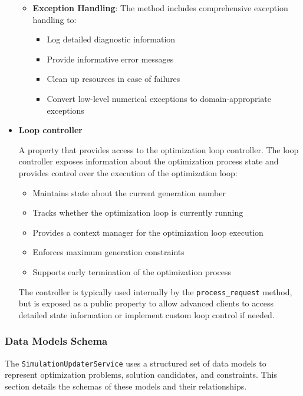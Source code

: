 \begin{itemize}
\begin{itemize}
		\item \textbf{Exception Handling}: The method includes comprehensive exception handling to:
		\begin{itemize}
			\item Log detailed diagnostic information
			\item Provide informative error messages
			\item Clean up resources in case of failures
			\item Convert low-level numerical exceptions to domain-appropriate exceptions
		\end{itemize}
	\end{itemize}

	\item \textbf{Loop controller}

	A property that provides access to the optimization loop controller. The loop controller exposes information about the optimization process state and provides control over the execution of the optimization loop:

	\begin{itemize}
		\item Maintains state about the current generation number
		\item Tracks whether the optimization loop is currently running
		\item Provides a context manager for the optimization loop execution
		\item Enforces maximum generation constraints
		\item Supports early termination of the optimization process
	\end{itemize}

	The controller is typically used internally by the \texttt{process\_request} method, but is exposed as a public property to allow advanced clients to access detailed state information or implement custom loop control if needed.

\end{itemize}



\subsubsection{Data Models Schema}

The \texttt{SimulationUpdaterService} uses a structured set of data models to represent optimization problems, solution candidates, and constraints. This section details the schemas of these models and their relationships.

